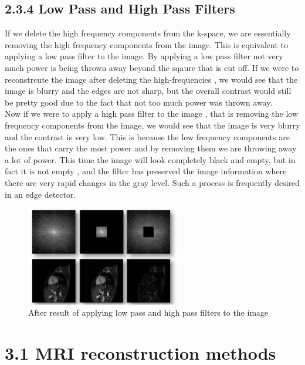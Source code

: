 \documentclass[12pt,fleqn]{article}
\begin{document}
\subsection{2.3.4 Low Pass and High Pass Filters}
If we delete the high frequency components from the k-space, we are essentially removing the high frequency components from the image. This is equivalent to applying a low pass filter to the image. By applying a low pass filter not very much power is being thrown away beyond the sqaure that is cut off. If we were to reconstrcute the image after deleting the high-frequencies , we would see that the image is blurry and the edges are not sharp, but the overall contrast would still be pretty good due to the fact that not too much power was thrown away.
\\
Now if we were to apply a high pass filter to the image , that is removing the low frequency components from the image, we would see that the image is very blurry and the contrast is very low. This is because the low frequency components are the ones that carry the most power and by removing them we are throwing away a lot of power. This time the image will look completely black and empty, but in fact it is not empty , and the filter has preserved the image information where there are very rapid changes in the gray level. Such a process is frequently desired in an edge detector.
\begin{figure}[H]
    \centering
    \includegraphics[width=0.6\textwidth]{high_low_filter_one.png}
    \caption{After result of applying low pass and high pass filters to the image}
    \label{fig:2.3.3}
\end{figure}
\section{3.1 MRI reconstruction methods}
\end{document}
